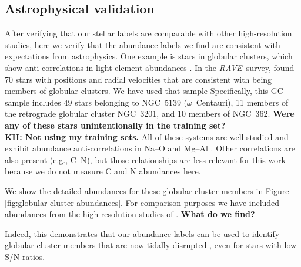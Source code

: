 \documentclass[preprint,trackchanges]{aastex}
\newcommand{\acronym}[1]{{\small{#1}}}
\newcommand{\project}[1]{\textsl{#1}}
\newcommand{\rave}{\project{\acronym{RAVE}}}
\newcommand{\stub}[1]{\textbf{#1}}
\begin{document}
\subsection{Astrophysical validation}

After verifying that our stellar labels are comparable with other
high-resolution studies, here we verify that the abundance labels we find
are consistent with expectations from astrophysics.  One example is stars in
globular clusters, which show anti-correlations in light element abundances 
\citep[e.g.,][and references therein]{Da_Costa,Carretta_2009}. In the \rave\
survey, \cite{Anguiano_2015} found 70 stars with positions and radial velocities that are
consistent with being members of globular clusters.  We have used that sample
Specifically, this GC sample includes 49 stars belonging to NGC~5139 ($\omega$~Centauri), 11 members of the retrograde
globular cluster NGC~3201, and 10 members of NGC~362.  
\stub{Were any of these stars unintentionally in the training set? \\ KH: Not using my training sets.}
All of these systems are well-studied and exhibit abundance anti-correlations 
in Na--O and Mg--Al \citep{people}.  Other correlations are also present 
(e.g., C--N), but those relationships are less relevant for this work because 
we do not measure C and N abundances here.


We show the detailed abundances for these globular cluster members in
Figure \ref{fig:globular-cluster-abundances}.  For comparison purposes we
have included abundances from the high-resolution studies of \citep{people}.
\stub{What do we find?}

Indeed, this demonstrates that our abundance labels can be used to identify
globular cluster members that are now tidally disrupted \citep{Anguiano_2016,Kuzma_2016,Navin_2016},
even for stars with low S/N ratios.

\end{document}

